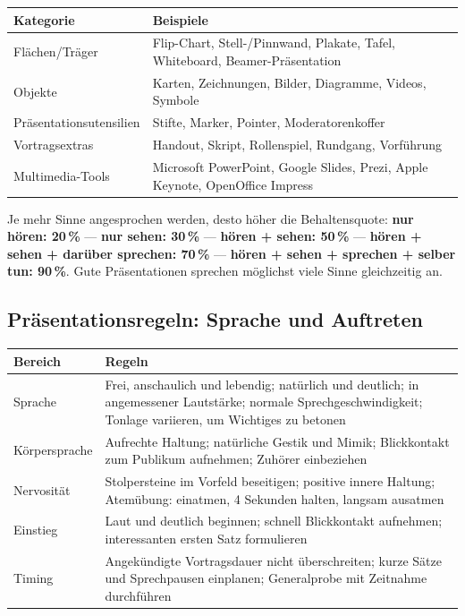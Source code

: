 \documentclass[11pt, a4paper]{article}
\begin{document}
\begin{center}
\begin{tabular}{p{3.5cm} p{9.5cm}}
\toprule
\textbf{Kategorie} & \textbf{Beispiele}\\
\midrule
Flächen/Träger & Flip-Chart, Stell-/Pinnwand, Plakate, Tafel, Whiteboard, Beamer-Präsentation\\
\addlinespace
Objekte & Karten, Zeichnungen, Bilder, Diagramme, Videos, Symbole\\
\addlinespace
Präsentationsutensilien & Stifte, Marker, Pointer, Moderatorenkoffer\\
\addlinespace
Vortragsextras & Handout, Skript, Rollenspiel, Rundgang, Vorführung\\
\addlinespace
Multimedia-Tools & Microsoft PowerPoint, Google Slides, Prezi, Apple Keynote, OpenOffice Impress\\
\bottomrule
\end{tabular}
\end{center}

\begin{merksatz}[title={\bfseries Merke: Behaltensquote und Sinnesvielfalt}]
Je mehr Sinne angesprochen werden, desto höher die Behaltensquote:
\textbf{nur hören: 20\,\%} --- \textbf{nur sehen: 30\,\%} --- \textbf{hören + sehen: 50\,\%} ---
\textbf{hören + sehen + darüber sprechen: 70\,\%} ---
\textbf{hören + sehen + sprechen + selber tun: 90\,\%}.
Gute Präsentationen sprechen möglichst viele Sinne gleichzeitig an.
\end{merksatz}

\subsection{Präsentationsregeln: Sprache und Auftreten}

\begin{center}
\begin{tabular}{p{3.5cm} p{9.5cm}}
\toprule
\textbf{Bereich} & \textbf{Regeln}\\
\midrule
Sprache & Frei, anschaulich und lebendig; natürlich und deutlich; in angemessener Lautstärke;
          normale Sprechgeschwindigkeit; Tonlage variieren, um Wichtiges zu betonen\\
\addlinespace
Körpersprache & Aufrechte Haltung; natürliche Gestik und Mimik; Blickkontakt zum Publikum aufnehmen;
                Zuhörer einbeziehen\\
\addlinespace
Nervosität & Stolpersteine im Vorfeld beseitigen; positive innere Haltung; Atemübung: einatmen,
             4 Sekunden halten, langsam ausatmen\\
\addlinespace
Einstieg & Laut und deutlich beginnen; schnell Blickkontakt aufnehmen; interessanten ersten Satz
           formulieren\\
\addlinespace
Timing & Angekündigte Vortragsdauer nicht überschreiten; kurze Sätze und Sprechpausen einplanen;
         Generalprobe mit Zeitnahme durchführen\\
\bottomrule
\end{tabular}
\end{center}
\end{document}
